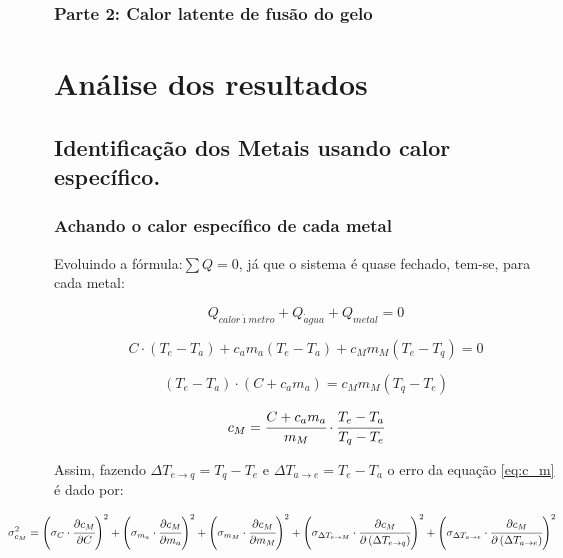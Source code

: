 \documentclass[a4paper]{article}
\begin{document}
			\subsubsection{Parte 2: Calor latente de fusão do gelo}


	\section{Análise dos resultados}


		\subsection{Identificação dos Metais usando calor específico.}

			\subsubsection{Achando o calor específico de cada metal}
				Evoluindo a fórmula:$\sum Q=0$, já que o sistema é quase fechado,
				tem-se, para cada metal:

				\begin{equation}
					Q_{calor\acute{\imath}metro}+Q_{\acute{a}gua}+Q_{metal}=0
				\end{equation}


				\[
					C\cdot\left(T_{e}-T_{a}\right)+c_{a}m_{a}\left(T_{e}-T_{a}\right)+c_{M}m_{M}\left(T_{e}-T_{q}\right)=0
				\]


				\[
					\left(T_{e}-T_{a}\right)\cdot\left(C+c_{a}m_{a}\right)=c_{M}m_{M}\left(T_{q}-T_{e}\right)
				\]


				\begin{equation}
					c_{M}=\cfrac{C+c_{a}m_{a}}{m_{M}}\cdot\cfrac{T_{e}-T_{a}}{T_{q}-T_{e}}\label{eq:c_m}
				\end{equation}


				Assim, fazendo $\Delta T_{e\rightarrow q}=T_{q}-T_{e}$ e $\Delta T_{a\rightarrow e}=T_{e}-T_{a}$
				o erro da equação \eqref{eq:c_m} é dado por:

			    
			    \begin{equation}
					\hspace{-1,5cm}
					\sigma_{c_{M}}^{2}=\left(\sigma_{C}\cdot\cfrac{\partial c_{M}}{\partial C}\right)^{2}+\left(\sigma_{m_{a}}\cdot\cfrac{\partial c_{M}}{\partial m_{a}}\right)^{2}+\left(\sigma_{m_{M}}\cdot\cfrac{\partial c_{M}}{\partial m_{M}}\right)^{2}+\left(\sigma_{\Delta T_{e\rightarrow M}}\cdot\cfrac{\partial c_{M}}{\partial\left(\Delta T_{e\rightarrow q}\right)}\right)^{2}+\left(\sigma_{\Delta T_{a\rightarrow e}}\cdot\cfrac{\partial c_{M}}{\partial\left(\Delta T_{a\rightarrow e}\right)}\right)^{2}
				\end{equation}
\end{document}
